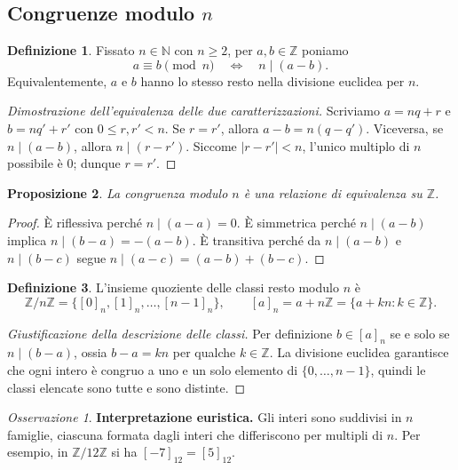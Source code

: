 \documentclass[11pt,a4paper]{article}
\newcommand{\N}{\mathbb{N}}
\newcommand{\Z}{\mathbb{Z}}
\theoremstyle{definition}
\newtheorem{definizione}{Definizione}[section]
\theoremstyle{plain}
\newtheorem{proposizione}[definizione]{Proposizione}
\theoremstyle{remark}
\newtheorem*{osservazione}{Osservazione}
\begin{document}
\subsection{Congruenze modulo $n$}
\begin{definizione}
Fissato $n\in\N$ con $n\ge2$, per $a,b\in\Z$ poniamo
\[
a\equiv b\pmod n\quad\Longleftrightarrow\quad n\mid(a-b).
\]
Equivalentemente, $a$ e $b$ hanno lo stesso resto nella divisione euclidea per $n$.
\end{definizione}
\begin{proof}[Dimostrazione dell'equivalenza delle due caratterizzazioni]
Scriviamo $a=nq+r$ e $b=nq'+r'$ con $0\le r,r'<n$. Se $r=r'$, allora $a-b=n(q-q')$. Viceversa, se $n\mid(a-b)$, allora $n\mid(r-r')$. Siccome $|r-r'|<n$, l'unico multiplo di $n$ possibile è $0$; dunque $r=r'$.
\end{proof}
\begin{proposizione}
La congruenza modulo $n$ è una relazione di equivalenza su $\Z$.
\end{proposizione}
\begin{proof}
È riflessiva perché $n\mid(a-a)=0$. È simmetrica perché $n\mid(a-b)$ implica $n\mid(b-a)=-(a-b)$. È transitiva perché da $n\mid(a-b)$ e $n\mid(b-c)$ segue $n\mid(a-c)=(a-b)+(b-c)$.
\end{proof}
\begin{definizione}
L'insieme quoziente delle classi resto modulo $n$ è
\[
\Z/n\Z=\{[0]_n,[1]_n,\ldots,[n-1]_n\},\qquad [a]_n=a+n\Z=\{a+kn:k\in\Z\}.
\]
\end{definizione}
\begin{proof}[Giustificazione della descrizione delle classi]
Per definizione $b\in[a]_n$ se e solo se $n\mid(b-a)$, ossia $b-a=kn$ per qualche $k\in\Z$. La divisione euclidea garantisce che ogni intero è congruo a uno e un solo elemento di $\{0,\ldots,n-1\}$, quindi le classi elencate sono tutte e sono distinte.
\end{proof}
\begin{osservazione}
\textbf{Interpretazione euristica.} Gli interi sono suddivisi in $n$ famiglie, ciascuna formata dagli interi che differiscono per multipli di $n$. Per esempio, in $\Z/12\Z$ si ha $[-7]_{12}=[5]_{12}$.
\end{osservazione}
\end{document}

